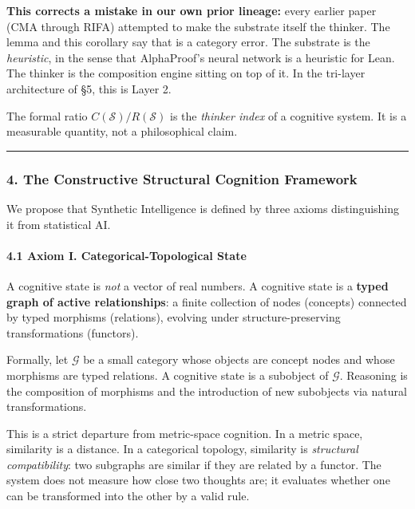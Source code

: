 \documentclass[
  11pt,
  a4paper,
]{article}
\begin{document}
\textbf{This corrects a mistake in our own prior lineage:} every earlier
paper (CMA through RIFA) attempted to make the substrate itself the
thinker. The lemma and this corollary say that is a category error. The
substrate is the \emph{heuristic}, in the sense that AlphaProof's neural
network is a heuristic for Lean. The thinker is the composition engine
sitting on top of it. In the tri-layer architecture of §5, this is Layer
2.

The formal ratio \(C(\mathcal{S})/R(\mathcal{S})\) is the \emph{thinker
index} of a cognitive system. It is a measurable quantity, not a
philosophical claim.

\begin{center}\rule{0.5\linewidth}{0.5pt}\end{center}

\subsubsection{4. The Constructive Structural Cognition
Framework}\label{the-constructive-structural-cognition-framework}

We propose that Synthetic Intelligence is defined by three axioms
distinguishing it from statistical AI.

\paragraph{4.1 Axiom I. Categorical-Topological
State}\label{axiom-i.-categorical-topological-state}

A cognitive state is \emph{not} a vector of real numbers. A cognitive
state is a \textbf{typed graph of active relationships}: a finite
collection of nodes (concepts) connected by typed morphisms (relations),
evolving under structure-preserving transformations (functors).

Formally, let \(\mathcal{G}\) be a small category whose objects are
concept nodes and whose morphisms are typed relations. A cognitive state
is a subobject of \(\mathcal{G}\). Reasoning is the composition of
morphisms and the introduction of new subobjects via natural
transformations.

This is a strict departure from metric-space cognition. In a metric
space, similarity is a distance. In a categorical topology, similarity
is \emph{structural compatibility}: two subgraphs are similar if they
are related by a functor. The system does not measure how close two
thoughts are; it evaluates whether one can be transformed into the other
by a valid rule.
\end{document}
